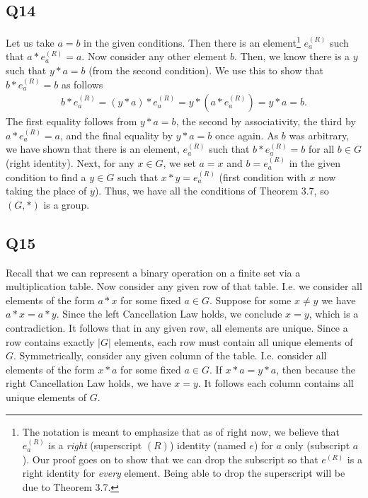 \documentclass[12pt]{article}
\numberwithin{theorem}{section}
\numberwithin{equation}{section}
\numberwithin{remark}{section}
\numberwithin{definition}{section}
\numberwithin{theorem}{section}
\numberwithin{lemma}{section}
\numberwithin{example}{section}
\begin{document}
\subsection{Q14}

Let us take $a=b$ in the given conditions. Then there is an element\footnote{The notation is meant to emphasize that as of right now, we believe that $e_a^{(R)}$ is a \emph{right} (superscript $(R)$) identity (named $e$) for $a$ only (subscript $a$). Our proof goes on to show that we can drop the subscript so that $e^{(R)}$ is a right identity for \emph{every} element. Being able to drop the superscript will be due to Theorem 3.7.} $e_a^{(R)}$ such that $a*e_a^{(R)}=a$. Now consider any other element $b$. Then, we know there is a $y$ such that $y*a=b$ (from the second condition). We use this to show that $b*e_a^{(R)}=b$ as follows
\begin{align*}
	b*e_a^{(R)} = (y*a) * e_a^{(R)} = y* \left(a * e_a^{(R)}\right) = y * a = b.
\end{align*}
The first equality follows from $y*a=b$, the second by associativity, the third by $a*e_a^{(R)}=a$, and the final equality by $y*a=b$ once again. As $b$ was arbitrary, we have shown that there is an element, $e_a^{(R)}$ such that $b*e_a^{(R)}=b$ for all $b\in G$ (right identity). Next, for any $x\in G$, we set $a=x$ and $b=e_a^{(R)}$ in the given condition to find a $y\in G$ such that $x*y=e_a^{(R)}$ (first condition with $x$ now taking the place of $y$). Thus, we have all the conditions of Theorem 3.7, so $(G,*)$ is a group. 



\subsection{Q15}

Recall that we can represent a binary operation on a finite set via a multiplication table. Now consider any given row of that table. I.e. we consider all elements of the form $a*x$ for some fixed $a\in G$. Suppose for some $x\neq y$ we have $a*x=a*y$. Since the left Cancellation Law holds, we conclude $x=y$, which is a contradiction. It follows that in any given row, all elements are unique. Since a row contains exactly $|G|$ elements, each row must contain all unique elements of $G$. Symmetrically, consider any given column of the table. I.e. consider all elements of the form $x*a$ for some fixed $a\in G$. If $x*a=y*a$, then because the right Cancellation Law holds, we have $x=y$. It follows each column contains all unique elements of $G$.
\end{document}
